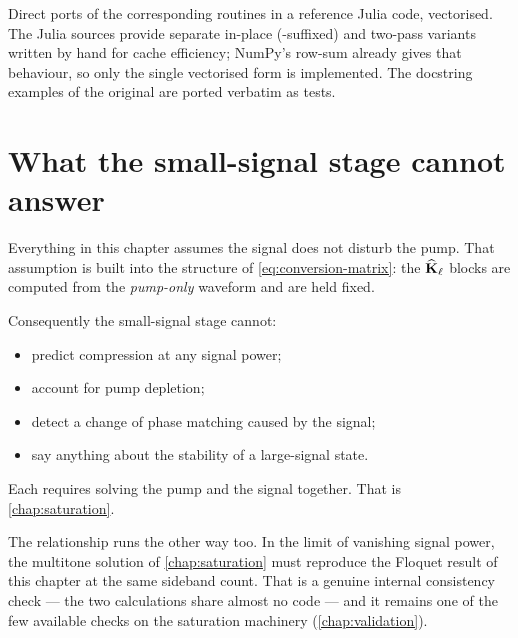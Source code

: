 \begin{implnote}
Direct ports of the corresponding routines in a reference Julia code,
vectorised. The Julia sources provide separate in-place (\code{!}-suffixed) and
two-pass variants written by hand for cache efficiency; NumPy's row-sum already
gives that behaviour, so only the single vectorised form is implemented. The
docstring examples of the original are ported verbatim as tests.
\end{implnote}

\section{What the small-signal stage cannot answer}

Everything in this chapter assumes the signal does not disturb the pump. That
assumption is built into the structure of \eqref{eq:conversion-matrix}: the
$\widehat{\mathbf{K}}_\ell$ blocks are computed from the \emph{pump-only} waveform and are held
fixed.

Consequently the small-signal stage cannot:
\begin{itemize}
\item predict compression at any signal power;
\item account for pump depletion;
\item detect a change of phase matching caused by the signal;
\item say anything about the stability of a large-signal state.
\end{itemize}

Each requires solving the pump and the signal together. That is
\cref{chap:saturation}.

\begin{remark}
The relationship runs the other way too. In the limit of vanishing signal power,
the multitone solution of \cref{chap:saturation} must reproduce the Floquet
result of this chapter at the same sideband count. That is a genuine internal
consistency check --- the two calculations share almost no code --- and it
remains one of the few available checks on the saturation machinery
(\cref{chap:validation}).
\end{remark}
